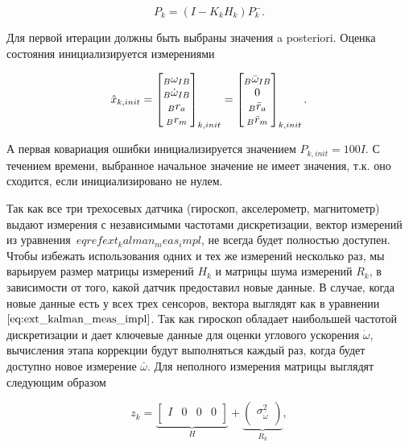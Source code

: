 \documentclass[12pt,a4paper]{article}
\newcounter{subsubsubsection}[subsubsection]
\begin{document}
\begin{equation}
\label{eq:ext_kalman_P_apost}
	P_k = (I - K_kH_k)P_k^- .
\end{equation}

Для первой итерации должны быть выбраны значения a posteriori. Оценка состояния инициализируется измерениями

\begin{equation*}
	\hat x_{k,init} = 
	\begin{bmatrix}
		{\vphantom \omega}_B \omega_{IB} \\
		{\vphantom \omega}_B \dot\omega_{IB} \\
		{\vphantom r}_B r_a \\
		{\vphantom r}_B r_m \\
	\end{bmatrix}_{k,init} =
	\begin{bmatrix}
		{\vphantom \omega}_B \bar\omega_{IB} \\
		0 \\
		{\vphantom r}_B \bar r_a \\
		{\vphantom r}_B \bar r_m \\
	\end{bmatrix}_{k,init} .
\end{equation*}

А первая ковариация ошибки инициализируется значением $P_{k,init}=100I$. С течением времени, выбранное начальное значение не имеет значения, т.к. оно сходится, если инициализировано не нулем.


Так как все три трехосевых датчика (гироскоп, акселерометр, магнитометр) выдают измерения с независимыми частотами дискретизации, вектор измерений из уравнения~$eqref{ext_kalman_meas_impl}$, не всегда будет полностью доступен. Чтобы избежать использования одних и тех же измерений несколько раз, мы варьируем размер матрицы измерений $H_k$ и матрицы шума измерений $R_k$, в зависимости от того, какой датчик предоставил новые данные. В случае, когда новые данные есть у всех трех сенсоров, вектора выглядят как в уравнении~$\eqref{eq:ext_kalman_meas_impl}$. Так как гироскоп обладает наибольшей частотой дискретизации и дает ключевые данные для оценки углового ускорения $\dot\omega$, вычисления этапа коррекции будут выполняться каждый раз, когда будет доступно новое измерение $\bar \omega$. Для неполного измерения матрицы выглядят следующим образом

\begin{equation*}
	z_k = \underbrace{
		\begin{bmatrix}
			I & 0 & 0 & 0 \\
		\end{bmatrix}
	}_H + \underbrace{
		\begin{pmatrix}
			\sigma_{\bar\omega}^2 \\
		\end{pmatrix}
	}_{R_k},
\end{equation*}	
\end{document}
